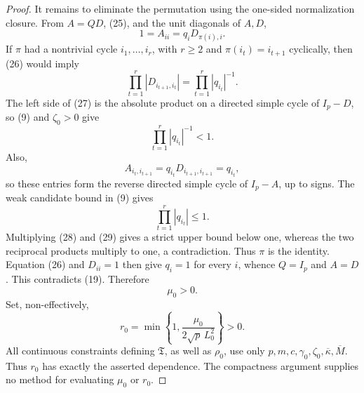 \documentclass{article}
\begin{document}
\begin{proof}
It remains to eliminate the permutation using the one-sided normalization closure. From \(A=QD\), (25), and the unit diagonals of \(A,D\),
\[
1=A_{ii}=q_iD_{\pi(i),i}.
\tag{26}
\]
If \(\pi\) had a nontrivial cycle \(i_1,\ldots,i_r\), with \(r\geq2\) and \(\pi(i_t)=i_{t+1}\) cyclically, then (26) would imply
\[
\prod_{t=1}^r|D_{i_{t+1},i_t}|
=\prod_{t=1}^r|q_{i_t}|^{-1}.
\tag{27}
\]
The left side of (27) is the absolute product on a directed simple cycle of \(I_p-D\), so (9) and \(\zeta_0>0\) give
\[
\prod_{t=1}^r|q_{i_t}|^{-1}<1.
\tag{28}
\]
Also,
\[
A_{i_t,i_{t+1}}
=q_{i_t}D_{i_{t+1},i_{t+1}}
=q_{i_t},
\]
so these entries form the reverse directed simple cycle of \(I_p-A\), up to signs. The weak candidate bound in (9) gives
\[
\prod_{t=1}^r|q_{i_t}|\leq1.
\tag{29}
\]
Multiplying (28) and (29) gives a strict upper bound below one, whereas the two reciprocal products multiply to one, a contradiction. Thus \(\pi\) is the identity. Equation (26) and \(D_{ii}=1\) then give \(q_i=1\) for every \(i\), whence \(Q=I_p\) and \(A=D\). This contradicts (19). Therefore
\[
\mu_0>0.
\tag{30}
\]
Set, non-effectively,
\[
r_0=\min\left\{1,\frac{\mu_0}{2\sqrt p\,L_0^2}\right\}>0.
\tag{31}
\]
All continuous constraints defining \(\mathfrak T\), as well as \(\rho_0\), use only \(p,m,c,\gamma_0,\zeta_0,\overline\kappa,\overline M\). Thus \(r_0\) has exactly the asserted dependence. The compactness argument supplies no method for evaluating \(\mu_0\) or \(r_0\).


\end{proof}
\end{document}
